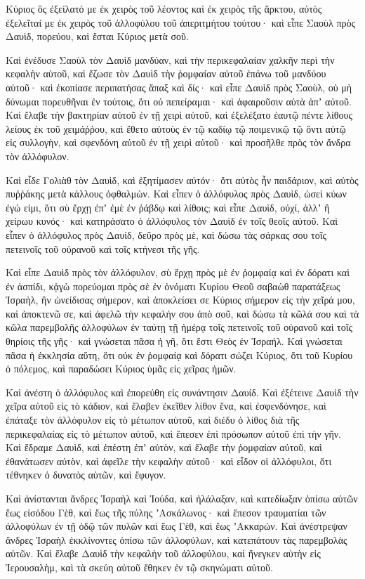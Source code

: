 {Κύριος ὃς ἐξείλατό με ἐκ χειρὸς τοῦ λέοντος καὶ ἐκ χειρὸς τῆς ἄρκτου, αὐτὸς ἐξελεῖταί με ἐκ χειρὸς τοῦ ἀλλοφύλου τοῦ ἀπεριτμήτου τούτου· καὶ εἶπε Σαοὺλ πρὸς Δαυὶδ, πορεύου, καὶ ἔσται Κύριος μετὰ σοῦ.
\par }{\PP {}Καὶ ἐνέδυσε Σαοὺλ τὸν Δαυὶδ μανδύαν, καὶ τὴν περικεφαλαίαν χαλκῆν περὶ τὴν κεφαλὴν αὐτοῦ,
καὶ ἔζωσε τὸν Δαυὶδ τὴν ῥομφαίαν αὐτοῦ ἐπάνω τοῦ μανδύου αὐτοῦ· καὶ ἐκοπίασε περιπατήσας ἅπαξ καὶ δίς· καὶ εἶπε Δαυὶδ πρὸς Σαοὺλ, οὐ μὴ δύνωμαι πορευθῆναι ἐν τούτοις, ὅτι οὐ πεπείραμαι· καὶ ἀφαιροῦσιν αὐτὰ ἀπʼ αὐτοῦ.
Καὶ ἔλαβε τὴν βακτηρίαν αὐτοῦ ἐν τῇ χειρὶ αὐτοῦ, καὶ ἐξελέξατο ἑαυτῷ πέντε λίθους λείους ἐκ τοῦ χειμάῤῥου, καὶ ἔθετο αὐτοὺς ἐν τῷ καδίῳ τῷ ποιμενικῷ τῷ ὄντι αὐτῷ εἰς συλλογὴν, καὶ σφενδόνη αὐτοῦ ἐν τῇ χειρὶ αὐτοῦ· καὶ προσῆλθε πρὸς τὸν ἄνδρα τὸν ἀλλόφυλον.
\par }{\PP {}Καὶ εἶδε Γολιὰθ τὸν Δαυὶδ, καὶ ἐξητίμασεν αὐτόν· ὅτι αὐτὸς ἦν παιδάριον, καὶ αὐτὸς πυῤῥάκης μετὰ κάλλους ὀφθαλμὼν.
Καὶ εἶπεν ὁ ἀλλόφυλος πρὸς Δαυὶδ, ὡσεὶ κύων ἐγώ εἰμι, ὅτι σὺ ἔρχῃ ἐπʼ ἐμὲ ἐν ῥάβδῳ καὶ λίθοις; καὶ εἶπε Δαυὶδ, οὐχί, ἀλλʼ ἢ χείρωυ κυνός· καὶ κατηράσατο ὁ ἀλλόφυλος τὸν Δαυὶδ ἐν τοῖς θεοῖς αὐτοῦ.
Καὶ εἶπεν ὁ ἀλλόφυλος πρὸς Δαυὶδ, δεῦρο πρὸς μὲ, καὶ δώσω τὰς σάρκας σου τοῖς πετεινοῖς τοῦ οὐρανοῦ καὶ τοῖς κτήνεσι τῆς γῆς.
\par }{\PP {}Καὶ εἶπε Δαυὶδ πρὸς τὸν ἀλλόφυλον, σὺ ἔρχῃ πρὸς μὲ ἐν ῥομφαίᾳ καὶ ἐν δόρατι καὶ ἐν ἀσπίδι, κᾀγὼ πορεύομαι πρὸς σὲ ἐν ὀνόματι Κυρίου Θεοῦ σαβαὼθ παρατάξεως Ἰσραὴλ, ἣν ὠνείδισας σήμερον,
καὶ ἀποκλείσει σε Κύριος σήμερον εἰς τὴν χεῖρά μου, καὶ ἀποκτενῶ σε, καὶ ἀφελῶ τὴν κεφαλήν σου ἀπὸ σοῦ, καὶ δώσω τὰ κῶλά σου καὶ τὰ κῶλα παρεμβολῆς ἀλλοφύλων ἐν ταύτῃ τῇ ἡμέρᾳ τοῖς πετεινοῖς τοῦ οὐρανοῦ καὶ τοῖς θηρίοις τῆς γῆς· καὶ γνώσεται πᾶσα ἡ γῆ, ὅτι ἔστι Θεὸς ἐν Ἰσραήλ.
Καὶ γνώσεται πᾶσα ἡ ἐκκλησία αὕτη, ὅτι οὐκ ἐν ῥομφαίᾳ καὶ δόρατι σώζει Κύριος, ὅτι τοῦ Κυρίου ὁ πόλεμος, καὶ παραδώσει Κύριος ὑμᾶς εἰς χεῖρας ἡμῶν.
\par }{\PP {}Καὶ ἀνέστη ὁ ἀλλόφυλος καὶ ἐπορεύθη εἰς συνάντησιν Δαυίδ.
Καὶ ἐξέτεινε Δαυὶδ τὴν χεῖρα αὐτοῦ εἰς τὸ κάδιον, καὶ ἔλαβεν ἐκεῖθεν λίθον ἕνα, καὶ ἐσφενδόνησε, καὶ ἐπάταξε τὸν ἀλλόφυλον εἰς τὸ μέτωπον αὐτοῦ, καὶ διέδυ ὁ λίθος διὰ τῆς περικεφαλαίας εἰς τὸ μέτωπον αὐτοῦ, καὶ ἔπεσεν ἐπὶ πρόσωπον αὐτοῦ ἐπὶ τὴν γῆν.
Καὶ ἔδραμε Δαυὶδ, καὶ ἐπέστη ἐπʼ αὐτὸν, καὶ ἔλαβε τὴν ῥομφαίαν αὐτοῦ, καὶ ἐθανάτωσεν αὐτὸν, καὶ ἀφεῖλε τὴν κεφαλὴν αὐτοῦ· καὶ εἶδον οἱ ἀλλόφυλοι, ὅτι τέθνηκεν ὁ δυνατὸς αὐτῶν, καὶ ἔφυγον.
\par }{\PP {}Καὶ ἀνίστανται ἄνδρες Ἰσραὴλ καὶ Ἰούδα, καὶ ἠλάλαξαν, καὶ κατεδίωξαν ὀπίσω αὐτῶν ἕως εἰσόδου Γὲθ, καὶ ἕως τῆς πύλης ʼΑσκάλωνος· καὶ ἔπεσον τραυματίαι τῶν ἀλλοφύλων ἐν τῇ ὁδῷ τῶν πυλῶν καὶ ἕως Γὲθ, καὶ ἕως ʼΑκκαρών.
Καὶ ἀνέστρεψαν ἄνδρες Ἰσραὴλ ἐκκλίνοντες ὀπίσω τῶν ἀλλοφύλων, καὶ κατεπάτουν τὰς παρεμβολὰς αὐτῶν.
Καὶ ἔλαβε Δαυὶδ τὴν κεφαλὴν τοῦ ἀλλοφύλου, καὶ ἤνεγκεν αὐτὴν εἰς Ἰερουσαλὴμ, καὶ τὰ σκεύη αὐτοῦ ἔθηκεν ἐν τῷ σκηνώματι αὐτοῦ.

}
